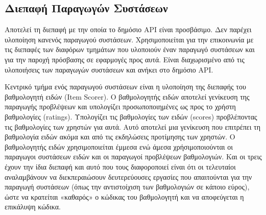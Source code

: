 \subsection{Διεπαφή Παραγωγών Συστάσεων}
Αποτελεί τη διεπαφή με την οποία το δημόσιο ΑΡΙ είναι προσβάσιμο. Δεν παρέχει υλοποίηση κανενός παραγωγού συστάσεων. Χρησιμοποιείται για την επικοινωνία με τις διεπαφές των διαφόρων τμημάτων που υλοποιούν έναν παραγωγό συστάσεων και για την παροχή πρόσβασης σε εφαρμογές προς αυτά. Είναι διαχωρισμένο από τις υλοποιήσεις των παραγωγών συστάσεων και ανήκει στο δημόσιο ΑΡΙ. \par 
Κεντρικό τμήμα ενός παραγωγού συστάσεων είναι η υλοποίηση της διεπαφής του βαθμολογητή ειδών ({\en Item Scorer}). Ο βαθμολογητής ειδών αποτελεί  γενίκευση της παραγωγής προβλέψεων και υπολογίζει προσωποποιημένες ως προς το χρήστη βαθμολογίες ({\en ratings}). Υπολογίζει τις βαθμολογίες των ειδών ({\en scores}) προβλέπο\-ντας τις βαθμολογίες των χρηστών για αυτά. Αυτό αποτελεί μια γενίκευση που επιτρέπει τη βαθμολογία ειδών ακόμα και από τις εκδηλώσεις προτίμησης των χρηστών. Ο βαθμολογητής ειδών χρησιμοποιείται έμμεσα ενώ άμεσα χρήσιμοποιούνται οι παραγωγοι συστάσεων ειδών και οι παραγωγοί προβλέψεων βαθμολογιών. Και οι τρεις έχουν την ίδια διεπαφή και αυτό που τους διαφοροποιεί είναι ότι οι τελευταίοι αναλαμβάνουν να διεκπεραιώσουν δευτερεύουσες εργασίες που απαιτούνται για την παραγωγή συστάσεων (όπως την αντιστοίχιση των βαθμολογιών σε κάποιο εύρος), ώστε να κρατείται «καθαρός» ο κώδικας του βαθμολογητή και να αποφεύγεται η επικάλυψη κώδικα. 
